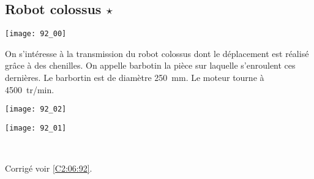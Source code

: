 \normaltrue \difficilefalse \tdifficilefalse
\correctionfalse


\subsection*{Robot colossus $\star$ \label{C2:06:92}}
\setcounter{question}{0}

\ifcorrection
\else
{}
\fi

\ifprof
\else


\begin{marginfigure}
\texttt{[image: 92\_00]}
\end{marginfigure}
On s'intéresse à la transmission du robot colossus dont le déplacement est réalisé grâce à des chenilles. On appelle barbotin la pièce sur laquelle s'enroulent ces dernières. Le barbortin est de diamètre \SI{250}{mm}.
Le moteur tourne à \SI{4500}{tr/min}.

\begin{marginfigure}
\texttt{[image: 92\_02]}
\end{marginfigure}

\begin{center}
\texttt{[image: 92\_01]}
\end{center}


\fi




\ifprof
\else
\fi

\ifprof ~\\

\else
\fi


\ifprof
\else
\begin{flushright}
\footnotesize{Corrigé  voir \ref{C2:06:92}.}
\end{flushright}%
\fi